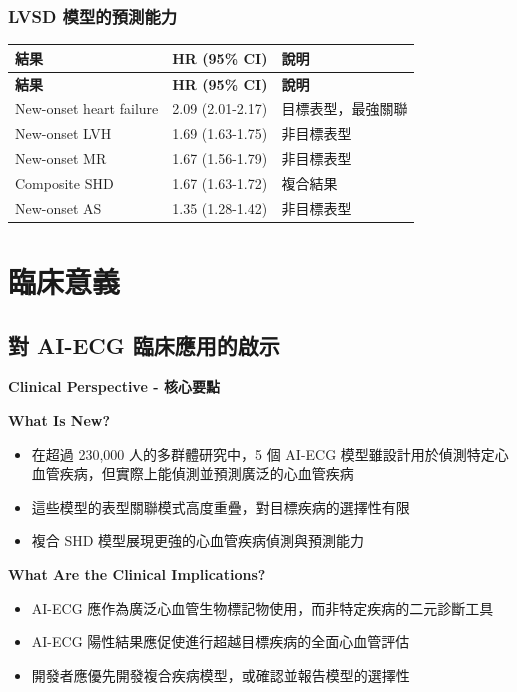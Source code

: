 \documentclass[12pt,a4paper]{article}
\begin{document}
\subsubsection{LVSD 模型的預測能力}

\begin{longtable}{p{5cm}p{4cm}p{5cm}}
\toprule
\textbf{結果} & \textbf{HR (95\% CI)} & \textbf{說明} \\
\midrule
\endfirsthead
\toprule
\textbf{結果} & \textbf{HR (95\% CI)} & \textbf{說明} \\
\midrule
\endhead
New-onset heart failure & 2.09 (2.01-2.17) & 目標表型，最強關聯 \\
\midrule
New-onset LVH & 1.69 (1.63-1.75) & 非目標表型 \\
\midrule
New-onset MR & 1.67 (1.56-1.79) & 非目標表型 \\
\midrule
Composite SHD & 1.67 (1.63-1.72) & 複合結果 \\
\midrule
New-onset AS & 1.35 (1.28-1.42) & 非目標表型 \\
\bottomrule
\end{longtable}


\section{臨床意義}

\subsection{對 AI-ECG 臨床應用的啟示}

\begin{importantbox}
\textbf{Clinical Perspective - 核心要點}

\textbf{What Is New?}
\begin{itemize}
    \item 在超過 230,000 人的多群體研究中，5 個 AI-ECG 模型雖設計用於偵測特定心血管疾病，但實際上能偵測並預測廣泛的心血管疾病
    \item 這些模型的表型關聯模式高度重疊，對目標疾病的選擇性有限
    \item 複合 SHD 模型展現更強的心血管疾病偵測與預測能力
\end{itemize}

\textbf{What Are the Clinical Implications?}
\begin{itemize}
    \item AI-ECG 應作為廣泛心血管生物標記物使用，而非特定疾病的二元診斷工具
    \item AI-ECG 陽性結果應促使進行超越目標疾病的全面心血管評估
    \item 開發者應優先開發複合疾病模型，或確認並報告模型的選擇性
\end{itemize}
\end{importantbox}
\end{document}
